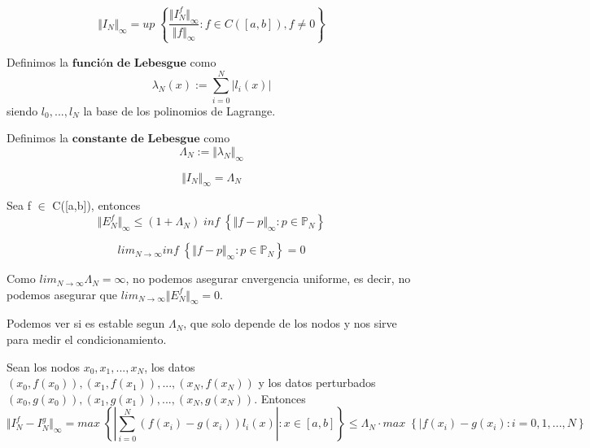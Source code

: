 \begin{nprop}
\[ \Vert I_N \Vert _\infty = up \; \left\lbrace \frac{\Vert I_N^f \Vert _\infty}{\Vert f \Vert _\infty} : f \in C( \left[ a,b \right] ), f \neq 0 \right\rbrace \]
\end{nprop}

\begin{ndef}
Definimos la $\textbf{función de Lebesgue}$ como
\[ \lambda _N(x) := \sum_{i=0}^N \vert l_i(x) \vert \]
siendo {$l_0,...,l_N$} la base de los polinomios de Lagrange.
\end{ndef}

\begin{ndef}
Definimos la $\textbf{constante de Lebesgue}$ como
\[ \Lambda _N := \Vert \lambda _N \Vert _\infty \]
\end{ndef}

\begin{nprop}
\[ \Vert I_N \Vert _\infty = \Lambda _N \]
\end{nprop}

\begin{ncor}
Sea f $\in$ C([a,b]), entonces
\[ \Vert E_N^f \Vert _\infty \leq (1+\Lambda _N) \; inf \; \left\lbrace \Vert f-p \Vert _\infty : p \in \mathbb{P} _N \right\rbrace \]
\end{ncor}

\begin{nth}
\[ lim_{N\rightarrow \infty} inf \; \left\lbrace \Vert f-p \Vert _\infty : p \in \mathbb{P} _N \right\rbrace = 0 \]
\end{nth}

Como $lim _{N\rightarrow \infty} \Lambda _N = \infty$, no podemos asegurar cnvergencia uniforme, es decir, no podemos asegurar que $lim_{N\rightarrow \infty} \Vert E_N^f \Vert _\infty = 0$.

Podemos ver si es estable segun $\Lambda _N$, que solo depende de los nodos y nos sirve para medir el condicionamiento.

\begin{nprop}
Sean los nodos $x_0,x_1,...,x_N$, los datos $(x_0,f(x_0)), (x_1,f(x_1)),...,(x_N,f(x_N))$ y los datos perturbados $(x_0,g(x_0)),(x_1,g(x_1)),...,(x_N,g(x_N))$. Entonces
\[ \Vert I_N^f - I_N^g \Vert _\infty = max \; \left\lbrace \left\vert \sum_{i=0}^N (f(x_i)-g(x_i))l_i(x) \right\vert : x \in \left[ a,b \right] \right\rbrace \leq \Lambda _N \cdot max \; \left\lbrace \vert f(x_i)-g(x_i) : i=0,1,...,N \right\rbrace \]
\end{nprop}

